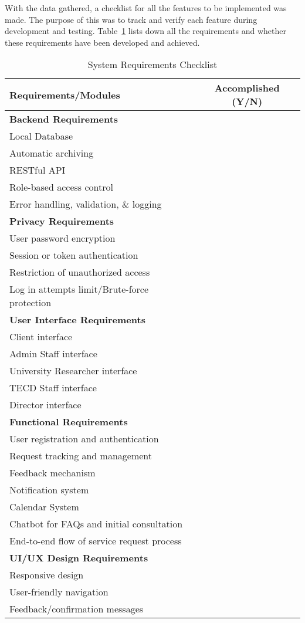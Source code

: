 With the data gathered, a checklist for all the features to be implemented was made. The purpose of this was to track and verify each feature during development and testing. Table~\ref{tab:requirements} lists down all the requirements and whether these requirements have been developed and achieved.

\newpage

\begin{table}[ht]
	\centering
	\begin{tabular}{|p{10cm}|c|}
		\hline
		\textbf{Requirements/Modules} & \textbf{Accomplished (Y/N)} \\
		\hline
		\multicolumn{2}{|l|}{\textbf{Backend Requirements}} \\
		\hline
		Local Database & \\
		Automatic archiving & \\
		RESTful API & \\
		Role-based access control & \\
		Error handling, validation, \& logging & \\
		\hline
		\multicolumn{2}{|l|}{\textbf{Privacy Requirements}} \\
		\hline
		User password encryption & \\
		Session or token authentication & \\
		Restriction of unauthorized access & \\
		Log in attempts limit/Brute-force protection & \\
		\hline
		\multicolumn{2}{|l|}{\textbf{User Interface Requirements}} \\
		\hline
		Client interface & \\
		Admin Staff interface & \\
		University Researcher interface & \\
		TECD Staff interface & \\
		Director interface & \\
		\hline
		\multicolumn{2}{|l|}{\textbf{Functional Requirements}} \\
		\hline
		User registration and authentication & \\
		Request tracking and management & \\
		Feedback mechanism & \\
		Notification system & \\
		Calendar System & \\
		Chatbot for FAQs and initial consultation & \\
		End-to-end flow of service request process & \\
		\hline
		\multicolumn{2}{|l|}{\textbf{UI/UX Design Requirements}} \\
		\hline
		Responsive design & \\
		User-friendly navigation & \\
		Feedback/confirmation messages & \\
		\hline
	\end{tabular}
	\caption{System Requirements Checklist}
	\label{tab:requirements}
\end{table}

